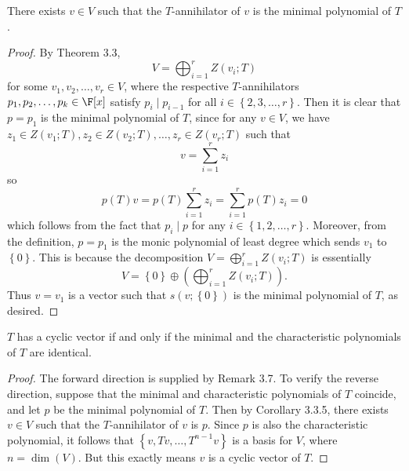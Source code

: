 \documentclass[math_245.tex]{subfiles}
\begin{document}
    \begin{cor}{}
        There exists $v\in V$ such that the $T$-annihilator of $v$ is the minimal polynomial of $T$.
    \end{cor}	

    \begin{proof}
        By Theorem 3.3,
        \begin{equation*}
            V = \bigoplus^{r}_{i=1} Z\left( v_i;T \right) 
        \end{equation*}
        for some $v_1,v_2,\ldots,v_r\in V$, where the respective $T$-annihilators $p_1,p_2,\ldots,p_k\in\F[x]$ satisfy $p_i\mid p_{i-1}$ for all $i\in \left\lbrace 2,3,\ldots,r \right\rbrace$. Then it is clear that $p=p_1$ is the minimal polynomial of $T$, since for any $v\in V$, we have $z_1\in Z(v_1;T), z_2\in Z(v_2;T), \ldots, z_r\in Z\left( v_r;T \right)$ such that
        \begin{equation*}
            v = \sum^{r}_{i=1} z_i
        \end{equation*}
        so
        \begin{equation*}
            p(T)v = p(T)\sum^{r}_{i=1} z_i = \sum^{r}_{i=1} p(T)z_i = 0
        \end{equation*}
        which follows from the fact that $p_i\mid p$ for any $i\in \left\lbrace 1,2,\ldots,r \right\rbrace$. Moreover, from the definition, $p=p_1$ is the monic polynomial of least degree which sends $v_1$ to $\left\lbrace 0 \right\rbrace$. This is because the decomposition $V=\bigoplus^{r}_{i=1} Z\left( v_i;T \right)$ is essentially
        \begin{equation*}
            V = \left\lbrace 0 \right\rbrace \oplus \left( \bigoplus^{r}_{i=1} Z\left( v_i;T \right)  \right) .
        \end{equation*}
        Thus $v=v_1$ is a vector such that $s\left( v;\left\lbrace 0 \right\rbrace  \right) $ is the minimal polynomial of $T$, as desired.
    \end{proof}

    \begin{cor}{}
        $T$ has a cyclic vector if and only if the minimal and the characteristic polynomials of $T$ are identical.
    \end{cor}	

    \begin{proof}
        The forward direction is supplied by Remark 3.7. To verify the reverse direction, suppose that the minimal and characteristic polynomials of $T$ coincide, and let $p$ be the minimal polynomial of $T$. Then by Corollary 3.3.5, there exists $v\in V$ such that the $T$-annihilator of $v$ is $p$. Since $p$ is also the characteristic polynomial, it follows that $\left\lbrace v,Tv, \ldots, T^{n-1}v \right\rbrace$ is a basis for $V$, where $n=\dim(V)$. But this exactly means $v$ is a cyclic vector of $T$.
    \end{proof}
\end{document}
